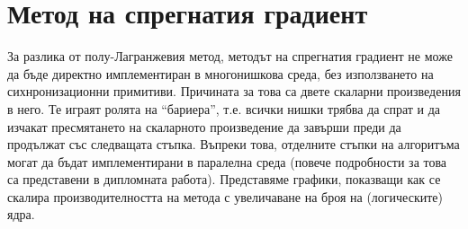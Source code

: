 \documentclass[12pt]{report}
\begin{document}
\section{Метод на спрегнатия градиент}
За разлика от полу-Лагранжевия метод, методът на спрегнатия градиент не може да бъде директно имплементиран в многонишкова среда, без използването на сихнронизационни примитиви. Причината за това са двете скаларни произведения в него. Те играят ролята на ``бариера'', т.е. всички нишки трябва да спрат и да изчакат пресмятането на скаларното произведение да завърши преди да продължат със следващата стъпка. Въпреки това, отделните стъпки на алгоритъма могат да бъдат имплементирани в паралелна среда (повече подробности за това са представени в дипломната работа). Представяме графики, показващи как се скалира производителността на метода с увеличаване на броя на (логическите) ядра.
\end{document}

